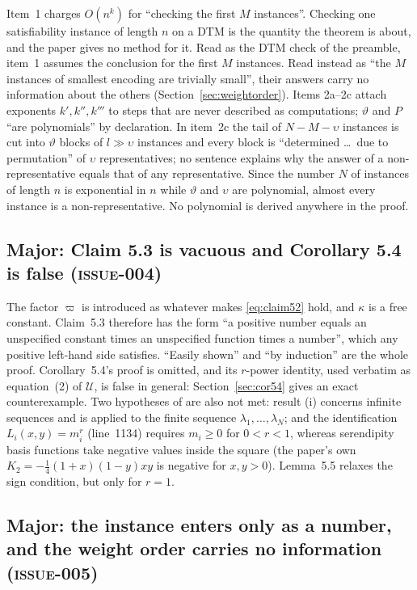 \documentclass[11pt,a4paper]{article}
\newcommand{\paperline}[1]{(line~#1)}
\newcommand{\issue}[1]{\textrm{\mdseries\textsc{issue-#1}}}
\begin{document}
Item~1 charges $O(n^k)$ for ``checking the first $M$ instances''. Checking one satisfiability instance of length $n$ on a DTM is the quantity the theorem is about, and the paper gives no method for it. Read as the DTM check of the preamble, item~1 assumes the conclusion for the first $M$ instances. Read instead as ``the $M$ instances of smallest encoding are trivially small'', their answers carry no information about the others (Section~\ref{sec:weightorder}). Items 2a--2c attach exponents $k',k'',k'''$ to steps that are never described as computations; $\vartheta$ and $P$ ``are polynomials'' by declaration. In item~2c the tail of $N-M-\upsilon$ instances is cut into $\vartheta$ blocks of $l\gg\upsilon$ instances and every block is ``determined \ldots\ due to permutation'' of $\upsilon$ representatives; no sentence explains why the answer of a non-representative equals that of any representative. Since the number $N$ of instances of length $n$ is exponential in $n$ while $\vartheta$ and $\upsilon$ are polynomial, almost every instance is a non-representative. No polynomial is derived anywhere in the proof.

\subsection{Major: Claim 5.3 is vacuous and Corollary 5.4 is false (\issue{004})}

The factor $\varpi$ is introduced as whatever makes \eqref{eq:claim52} hold, and $\kappa$ is a free constant. Claim~5.3 therefore has the form ``a positive number equals an unspecified constant times an unspecified function times a number'', which any positive left-hand side satisfies. ``Easily shown'' and ``by induction'' are the whole proof. Corollary~5.4's proof is omitted, and its $r$-power identity, used verbatim as equation~(2) of $\mathcal U$, is false in general: Section~\ref{sec:cor54} gives an exact counterexample. Two hypotheses of \cite{stepanets} are also not met: result (i) concerns infinite sequences and is applied to the finite sequence $\lambda_1,\ldots,\lambda_N$; and the identification $L_i(x,y)=m_i^r$ \paperline{1134} requires $m_i\ge 0$ for $0<r<1$, whereas serendipity basis functions take negative values inside the square (the paper's own $K_2=-\frac14(1+x)(1-y)xy$ is negative for $x,y>0$). Lemma~5.5 relaxes the sign condition, but only for $r=1$.

\subsection{Major: the instance enters only as a number, and the weight order carries no information (\issue{005})}
\end{document}
